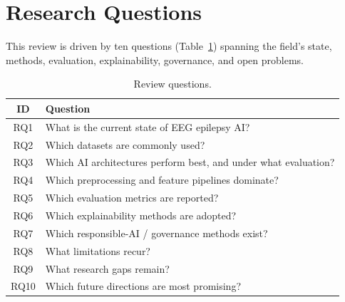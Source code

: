 \section{Research Questions}
This review is driven by ten questions (Table~\ref{tab:rq}) spanning the field's state, methods, evaluation, explainability, governance, and open problems.
\begin{table}[t]\centering\caption{Review questions.}\label{tab:rq}
\footnotesize\begin{tabular}{cl}\toprule
ID & Question\\\midrule
RQ1 & What is the current state of EEG epilepsy AI?\\
RQ2 & Which datasets are commonly used?\\
RQ3 & Which AI architectures perform best, and under what evaluation?\\
RQ4 & Which preprocessing and feature pipelines dominate?\\
RQ5 & Which evaluation metrics are reported?\\
RQ6 & Which explainability methods are adopted?\\
RQ7 & Which responsible-AI / governance methods exist?\\
RQ8 & What limitations recur?\\
RQ9 & What research gaps remain?\\
RQ10 & Which future directions are most promising?\\\bottomrule
\end{tabular}\end{table}

